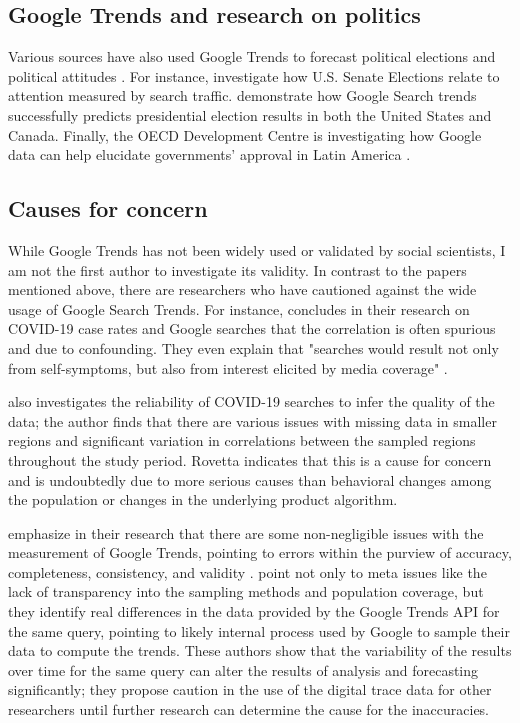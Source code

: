 \subsection{Google Trends and research on politics}

Various sources have also used Google Trends to forecast
political elections and political attitudes
\citep{wolfTrendingRightDirection2018}. For instance,
\citet{swearingenGoogleInsightsSenate2014} investigate how U.S. Senate
Elections relate to attention measured by search traffic.
\citet{prado-romanGoogleTrendsPredictor2020} demonstrate how Google Search trends
successfully predicts presidential election results in both the United
States and Canada. Finally, the OECD Development Centre is investigating
how Google data can help elucidate governments' approval in Latin
America \citep{montoyaUsingGoogleData2020}. 

\subsection{Causes for concern}

While Google Trends has not been widely used or validated by social scientists,
I am not the first author to investigate its validity.
In contrast to the papers mentioned above, there are researchers who have cautioned against
the wide usage of Google Search Trends. For instance, \citet{asseoTrackingCOVID19Using2020} 
concludes in their research on COVID-19 case rates and Google searches that the correlation 
is often spurious and due to confounding. They even explain that "searches would
result not only from self-symptoms, but also from interest elicited by
media coverage" \citep[][p.1]{asseoTrackingCOVID19Using2020}.

\citet{rovetta21} also investigates the reliability of COVID-19 searches to infer 
the quality of the data; the author finds that there are various issues with missing data in 
smaller regions and significant variation in correlations between the sampled regions throughout
the study period. Rovetta indicates that this is a cause for concern and is undoubtedly due to more 
serious causes than behavioral changes among the population or changes in the underlying product algorithm. 

\citet{cebrian_domenech22} emphasize in their research that there are some 
non-negligible issues with the measurement of Google Trends, pointing to 
errors within the purview of accuracy, completeness, consistency, and validity \citep{KarrDataQuality}. \citet{cebrian_domenech22} point not only to 
meta issues like the lack of transparency into the sampling methods 
and population coverage, but they identify real differences 
in the data provided by the Google Trends API for the same query, pointing
to likely internal process used by Google to sample their data to compute the trends.
These authors show that the variability of the results over time for the same query
can alter the results of analysis and forecasting significantly; they propose
caution in the use of the digital trace data for other researchers until
further research can determine the cause for the inaccuracies. 

